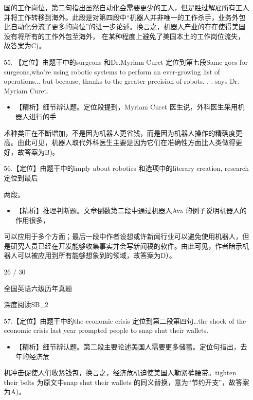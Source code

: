 \documentclass[UTF8,11pt]{ctexart}
\begin{document}
国的工作岗位，第二句指出虽然自动化会需要更少的工人，但是胜过解雇所有工人并将工作转移到海外。此段是对第四段中“机器人并非唯一的工作杀手，业务外包比自动化分流了更多的岗位”的进一步论述。换言之，机器人产业的存在使得美国没有将所有的工作外包至海外， 在某种程度上避免了美国本土的工作岗位流失，故答案为C)。


55. 【定位】由题干中的surgeons 和Dr.Myriam Curet 定位到第七段Same goes for surgeons,who're using robotic systems to perform an ever-growing list of operations... but because, thanks to the greater precision of robots. . . says Dr. Myriam Curet.


\begin{itemize}[leftmargin=2em,itemsep=.2em,topsep=.4em]\item[B.] 【精析】细节辨认题。定位段提到，Myriam Curet 医生说，外科医生采用机器人进行的手
\end{itemize}

术种类正在不断增加，不是因为机器人更省钱，而是因为机器人操作的精确度更高。由此可见，机器人取代外科医生主要是因为它们在准确性方面比人类做得更好，故答案为B)。


56.【定位】由题干中的imply about robotics 和选项中的literary creation, research 定位到最后


两段。


\begin{itemize}[leftmargin=2em,itemsep=.2em,topsep=.4em]\item[D.] 【精析】推理判断题。文章倒数第二段中通过机器人Ava 的例子说明机器人的作用很多，
\end{itemize}

可以应用于多个方面；最后一段中作者设想或许新闻行业可以避免使用机器人，但是研究人员已经在开发能够收集事实并会写新闻稿的软件。由此可见，作者暗示机器人可以被应用到所有能够想象到的领域，故答案为D）。


26 / 30


全国英语六级历年真题


深度阅读SB\_2


57.【定位】由题干中的the economic crisis 定位到第二段第四句…the shock of the economic crisis last year prompted people to snap shut their wallets.


\begin{itemize}[leftmargin=2em,itemsep=.2em,topsep=.4em]\item[A.] 【精析】细节辨认题。第二段主要论述美国人需要更多储蓄。定位句指出，去年的经济危
\end{itemize}

机冲击促使人们收紧钱包，换言之，经济危机迫使美国人勒紧裤腰带。tighten their belts 为原文中snap shut their wallets 的同义替换，意为“节约开支”，故答案为A)。
\end{document}
